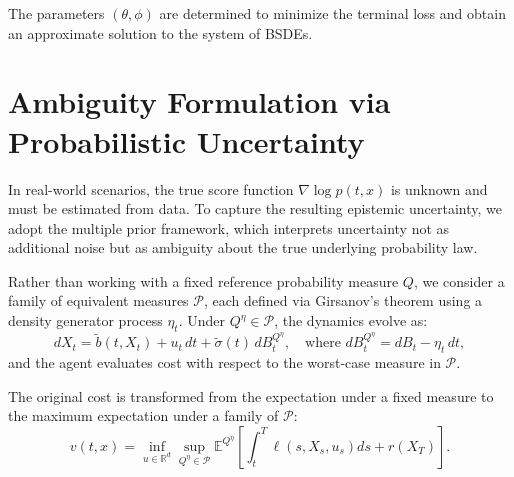 \documentclass[11pt]{article}
\def\w{\widetilde}
\begin{document}
The parameters $(\theta, \phi)$ are determined to minimize the terminal loss and obtain an approximate solution to the system of BSDEs.






\section{Ambiguity Formulation via Probabilistic Uncertainty}

In real-world scenarios, the true score function $\nabla \log p(t,x)$ is unknown and must be estimated from data. To capture the resulting epistemic uncertainty, we adopt the multiple prior framework, which interprets uncertainty not as additional noise but as ambiguity about the true underlying probability law.

Rather than working with a fixed reference probability measure $Q$, we consider a family of equivalent measures $\mathcal{P}$, each defined via Girsanov’s theorem using a density generator process $\eta_t$. Under $Q^\eta \in \mathcal{P}$, the dynamics evolve as:
\begin{equation}
       dX_t = \w b(t,X_t) + u_t\,dt + \w\sigma(t)\,dB_t^{Q^\eta}, \quad \text{where } dB_t^{Q^\eta} = dB_t - \eta_t\,dt, 
\end{equation}
and the agent evaluates cost with respect to the worst-case measure in $\mathcal{P}$.

The original cost is transformed from the expectation under a fixed measure to the maximum expectation under a family of $\mathcal{P}$:
\begin{equation}
    v(t,x) =\inf_{u\in \mathbb{R}^d} \sup_{Q^\eta \in \mathcal{P}}\mathbb{E}^{Q^\eta}\left[ \int_t^T \ell(s, X_s, u_s)ds + r(X_T) \right].
\end{equation}
\end{document}
